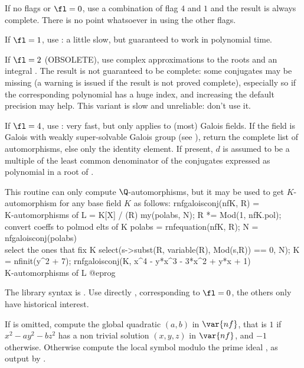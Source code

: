 If no flags or $\fl=0$, use a combination of flag $4$ and $1$ and the result
is always complete. There is no point whatsoever in using the other flags.

If $\fl=1$, use : a little slow, but guaranteed to work in
polynomial time.

If $\fl=2$ (OBSOLETE), use complex approximations to the roots and an integral
. The result is not guaranteed to be complete: some
conjugates may be missing (a warning is issued if the result is not proved
complete), especially so if the corresponding polynomial has a huge index,
and increasing the default precision may help. This variant is slow and
unreliable: don't use it.

If $\fl=4$, use : very fast, but only applies to (most) Galois
fields. If the field is Galois with weakly
super-solvable Galois group (see ), return the complete list
of automorphisms, else only the identity element. If present, $d$ is assumed to
be a multiple of the least common denominator of the conjugates expressed as
polynomial in a root of .

This routine can only compute $\Q$-automorphisms, but it may be used to get
$K$-automorphism for any base field $K$ as follows:
\bprog
rnfgaloisconj(nfK, R) = \\ K-automorphisms of L = K[X] / (R)
{ my(polabs, N);
  R *= Mod(1, nfK.pol);             \\ convert coeffs to polmod elts of K
  polabs = rnfequation(nfK, R);
  N = nfgaloisconj(polabs) %
  \\ select the ones that fix K
  select(s->subst(R, variable(R), Mod(s,R)) == 0, N);
}
K  = nfinit(y^2 + 7);
rnfgaloisconj(K, x^4 - y*x^3 - 3*x^2 + y*x + 1)  \\ K-automorphisms of L
@eprog

The library syntax is .
Use directly
, corresponding to $\fl = 0$, the others
only have historical interest.

\label{se:nfhilbert}
If  is omitted,
compute the global quadratic  $(a,b)$ in $\var{nf}$, that
is $1$ if $x^2 - a y^2 - b z^2$ has a non trivial solution $(x,y,z)$ in
$\var{nf}$, and $-1$ otherwise. Otherwise compute the local symbol modulo
the prime ideal , as output by .

